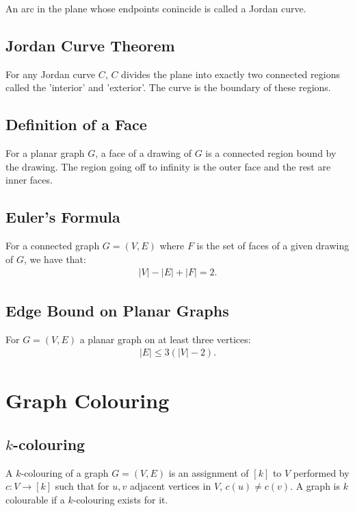 \documentclass[a4paper, 12pt, twoside]{article}
\begin{document}
An arc in the plane whose endpoints conincide is called a Jordan curve.

\subsection{Jordan Curve Theorem}

For any Jordan curve $C$, $C$ divides the plane into exactly two connected regions
called the 'interior' and 'exterior'. The curve is the boundary of these regions. 

\subsection{Definition of a Face}

For a planar graph $G$, a face of a drawing of $G$ is a connected region
bound by the drawing. The region going off to infinity is the outer face and
the rest are inner faces.

\subsection{Euler's Formula}

For a connected graph $G = (V, E)$ where $F$ is the set of faces of a given 
drawing of $G$, we have that: \begin{gather*}
  |V| - |E| + |F| = 2.
\end{gather*}

\subsection{Edge Bound on Planar Graphs}

For $G = (V, E)$ a planar graph on at least three vertices: \begin{gather*}
  |E| \leq 3(|V| - 2).
\end{gather*}

\section{Graph Colouring}

\subsection{$k$-colouring}

A $k$-colouring of a graph $G = (V, E)$ is an assignment of $[k]$ to $V$ 
performed by $c : V \to [k]$ such that for $u, v$ adjacent vertices in $V$, 
$c(u) \neq c(v)$. A graph is $k$ colourable if a $k$-colouring exists for it.
\end{document}

